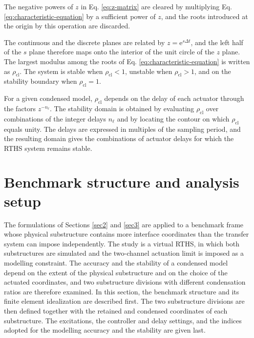\documentclass[a4paper,fleqn,review,12pt]{cas-sc}
\numberwithin{equation}{section}
\begin{document}
The negative powers of \(z\) in Eq. \eqref{eq:z-matrix} are cleared by multiplying Eq. \eqref{eq:characteristic-equation} by a sufficient power of \(z\), and the roots introduced at the origin by this operation are discarded.

The continuous and the discrete planes are related by \(z=\mathrm{e}^{s\Delta t}\), and the left half of the \(s\) plane therefore maps onto the interior of the unit circle of the \(z\) plane. The largest modulus among the roots of Eq. \eqref{eq:characteristic-equation} is written as \(\rho_{\mathrm{cl}}\). The system is stable when \(\rho_{\mathrm{cl}}<1\), unstable when \(\rho_{\mathrm{cl}}>1\), and on the stability boundary when \(\rho_{\mathrm{cl}}=1\).

For a given condensed model, \(\rho_{\mathrm{cl}}\) depends on the delay of each actuator through the factors \(z^{-n_{\ell}}\). The stability domain is obtained by evaluating \(\rho_{\mathrm{cl}}\) over combinations of the integer delays \(n_{\ell}\) and by locating the contour on which \(\rho_{\mathrm{cl}}\) equals unity. The delays are expressed in multiples of the sampling period, and the resulting domain gives the combinations of actuator delays for which the RTHS system remains stable.




\section{Benchmark structure and analysis setup} \label{sec4}

The formulations of Sections \ref{sec2} and \ref{sec3} are applied to a benchmark frame whose physical substructure contains more interface coordinates than the transfer system can impose independently. The study is a virtual RTHS, in which both substructures are simulated and the two-channel actuation limit is imposed as a modelling constraint. The accuracy and the stability of a condensed model depend on the extent of the physical substructure and on the choice of the actuated coordinates, and two substructure divisions with different condensation ratios are therefore examined. In this section, the benchmark structure and its finite element idealization are described first. The two substructure divisions are then defined together with the retained and condensed coordinates of each substructure. The excitations, the controller and delay settings, and the indices adopted for the modelling accuracy and the stability are given last.
\end{document}
